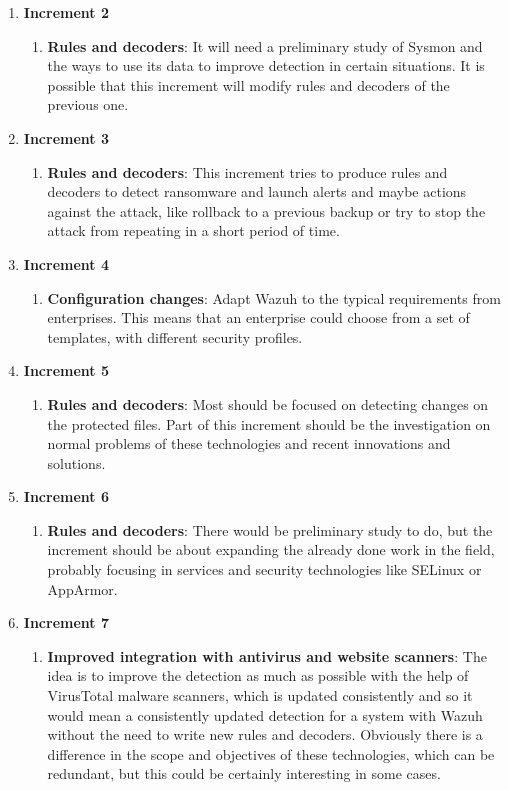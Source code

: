 \begin{enumerate}
	\item \textbf{Increment 2}
	\begin{enumerate}[label=\alph*]
		\item \textbf{Rules and decoders}: It will need a preliminary study of Sysmon and the ways to use its data to improve detection in certain situations. It is possible that this increment will modify rules and decoders of the previous one.
	\end{enumerate}

	\item \textbf{Increment 3}
	\begin{enumerate}[label=\alph*]
		\item \textbf{Rules and decoders}: This increment tries to produce rules and decoders to detect ransomware and launch alerts and maybe actions against the attack, like rollback to a previous backup or try to stop the attack from repeating in a short period of time.
	\end{enumerate}

	\item \textbf{Increment 4}
	\begin{enumerate}[label=\alph*]
		\item \textbf{Configuration changes}: Adapt Wazuh to the typical requirements from enterprises. This means that an enterprise could choose from a set of templates, with different security profiles.
	\end{enumerate}

	\item \textbf{Increment 5}
	\begin{enumerate}[label=\alph*]
		\item \textbf{Rules and decoders}: Most should be focused on detecting changes on the protected files. Part of this increment should be the investigation on normal problems of these technologies and recent innovations and solutions.
	\end{enumerate}

	\item \textbf{Increment 6}
	\begin{enumerate}[label=\alph*]
		\item \textbf{Rules and decoders}: There would be preliminary study to do, but the increment should be about expanding the already done work in the field, probably focusing in services and security technologies like SELinux or AppArmor.
	\end{enumerate}

	\item \textbf{Increment 7}
	\begin{enumerate}[label=\alph*]
		\item \textbf{Improved integration with antivirus and website scanners}: The idea is to improve the detection as much as possible with the help of VirusTotal malware scanners, which is updated consistently and so it would mean a consistently updated detection for a system with Wazuh without the need to write new rules and decoders. Obviously there is a difference in the scope and objectives of these technologies, which can be redundant, but this could be certainly interesting in some cases.
	\end{enumerate}


\end{enumerate}
